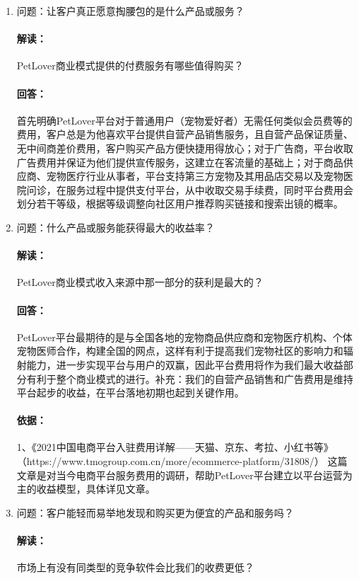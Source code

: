 \documentclass[a4paper]{ctexart}
\begin{document}
\begin{enumerate}[label=\alph*.]
  \item 问题：让客户真正愿意掏腰包的是什么产品或服务？
  \paragraph{解读：}PetLover商业模式提供的付费服务有哪些值得购买？
  \paragraph{回答：}首先明确PetLover平台对于普通用户（宠物爱好者）无需任何类似会员费等的费用，客户总是为他喜欢平台提供自营产品销售服务，且自营产品保证质量、无中间商差价费用，客户购买产品方便快捷用得放心；对于广告商，平台收取广告费用并保证为他们提供宣传服务，这建立在客流量的基础上；对于商品供应商、宠物医疗行业从事者，平台支持第三方宠物及其用品店交易以及宠物医院问诊，在服务过程中提供支付平台，从中收取交易手续费，同时平台费用会划分若干等级，根据等级调整向社区用户推荐购买链接和搜索出镜的概率。
  \item 问题：什么产品或服务能获得最大的收益率？
  \paragraph{解读：}PetLover商业模式收⼊来源中那⼀部分的获利是最⼤的？
  \paragraph{回答：}PetLover平台最期待的是与全国各地的宠物商品供应商和宠物医疗机构、个体宠物医师合作，构建全国的网点，这样有利于提高我们宠物社区的影响力和辐射能力，进一步实现平台与用户的双赢，因此平台费用将作为我们最大收益部分有利于整个商业模式的进行。补充：我们的自营产品销售和广告费用是维持平台起步的收益，在平台落地初期也起到关键作用。
  \paragraph{依据：}1、《2021中国电商平台入驻费用详解——天猫、京东、考拉、小红书等》\\（https://www.tmogroup.com.cn/more/ecommerce-platform/31808/）
  这篇文章是对当今电商平台服务费用的调研，帮助PetLover平台建立以平台运营为主的收益模型，具体详见文章。
  \item 问题：客户能轻而易举地发现和购买更为便宜的产品和服务吗？
  \paragraph{解读：}市场上有没有同类型的竞争软件会比我们的收费更低？

\end{enumerate}
\end{document}
